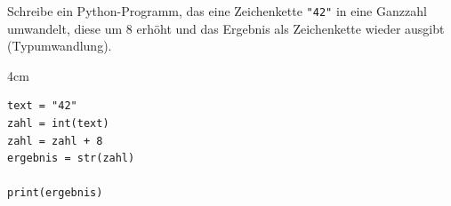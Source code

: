 \question[3]
Schreibe ein Python-Programm, das eine Zeichenkette \texttt{"42"} in eine Ganzzahl umwandelt,
diese um 8 erhöht und das Ergebnis als Zeichenkette wieder ausgibt (Typumwandlung).

\begin{solutionbox}{4cm}
\begin{lstlisting}
text = "42"
zahl = int(text)
zahl = zahl + 8
ergebnis = str(zahl)

print(ergebnis)
\end{lstlisting}
\end{solutionbox}